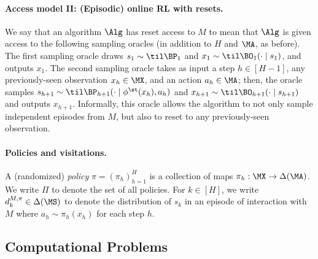 \paragraph{Access model II: (Episodic) online RL with resets.} We say that an algorithm $\Alg$ has reset access to $M$ to mean that $\Alg$ is given access to the following sampling oracles (in addition to $H$ and $\MA$, as before). The first sampling oracle draws $s_1 \sim \til\BP_1$ and $x_1 \sim \til\BO_1(\cdot\mid{}s_1)$, and outputs $x_1$. The second sampling oracle takes as input a step $h \in [H-1]$, any previously-seen observation $x_h \in \MX$, and an action $a_h \in \MA$; then, the oracle samples $s_{h+1} \sim \til\BP_{h+1}(\cdot\mid{}\phi^\st(x_h),a_h)$ and $x_{h+1} \sim \til\BO_{h+1}(\cdot\mid{}s_{h+1})$ and outputs $x_{h+1}$. Informally, this oracle allows the algorithm to not only sample independent episodes from $M$, but also to reset to any previously-seen observation.


\paragraph{Policies and visitations.} A (randomized) \emph{policy} $\pi = (\pi_h)_{h=1}^H$ is a collection of maps $\pi_h: \MX \to \Delta(\MA)$. We write $\Pi$ to denote the set of all policies. For $k \in [H]$, we write $d^{M,\pi}_k\in\Delta(\MS)$ to denote the distribution of $s_k$ in an episode of interaction with $M$ where $a_h\sim\pi_h(x_h)$ for each step $h$. %



\subsection{Computational Problems}

